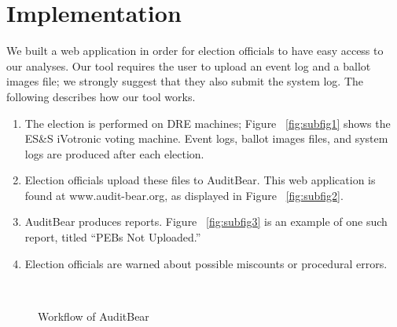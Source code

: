 \section{Implementation}
We built a web application in order for election officials to have easy access to our analyses.  Our tool requires the user to upload an event log and a ballot images file; we strongly suggest that they also submit the system log.  The following describes how our tool works.  

\begin{enumerate}
\item
The election is performed on DRE machines; Figure ~\ref{fig:subfig1} shows the ES\&S iVotronic voting machine.  Event logs, ballot images files, and system logs are produced after each election.
\item
Election officials upload these files to AuditBear.  This web application is found at www.audit-bear.org, as displayed in Figure ~\ref{fig:subfig2}.  
\item
AuditBear produces reports.  Figure ~\ref{fig:subfig3} is an example of one such report, titled \textquotedblleft PEBs Not Uploaded.\textquotedblright
\item
Election officials are warned about possible miscounts or procedural errors. 
\end{enumerate}

\begin{figure}[h]
\centering
\mbox{
}
\caption{Workflow of AuditBear}
\label{auditBear}
\end{figure}




